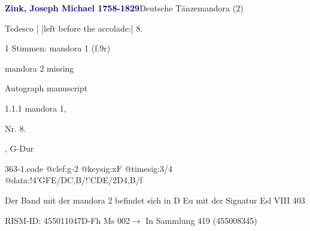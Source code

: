 \documentclass[twocolumn, 12pt]{book}
\begin{document}
\par \vspace{16pt} \textcolor{darkblue}{\textbf{Zink, Joseph Michael  1758-1829}}\hfillplus{\textbf{[363]}}\newline Deutsche Tänze\newline mandora (2)
\par \begin{itshape}[f.9v, at left:] Tedesco | [left before the accolade:] 8.\end{itshape} 
\par \textcolor{darkblue}{}  1 Stimmen: mandora 1  (f.9r)\newline \begin{small} mandora 2 missing\end{small} \newline Autograph manuscript
\par 1.1.1  mandora 1, \begin{itshape}Nr. 8.\end{itshape}, G-Dur  
\begin{filecontents*}{363-1.code}
@clef:g-2
@keysig:xF
@timesig:3/4
@data:!4'GFE/DC,B/!'CDE/2D4,B/f
\end{filecontents*}
\newline %
\par Der Band mit der mandora 2 befindet sich in D Eu mit der Signatur Esl VIII 403
\par RISM-ID: 455011047\newline D-Fh  Ms 002\newline $\rightarrow$ In Sammlung 419 (455008345)
      
\end{document}
